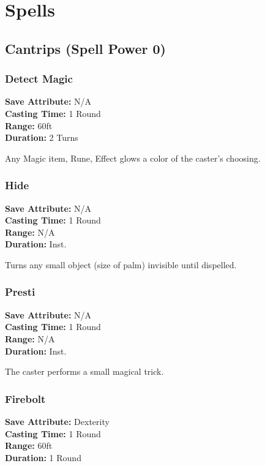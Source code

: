 \section*{Spells}%
\subsection*{Cantrips (Spell Power 0)}
\subsubsection*{Detect Magic}
\begin{mercClassInfo}
\textbf{Save Attribute:} N/A\\
\textbf{Casting Time:} 1 Round\\
\textbf{Range:} 60ft\\
\textbf{Duration:} 2 Turns
\end{mercClassInfo}

Any Magic item, Rune, Effect glows a color of the caster's choosing.

\subsubsection*{Hide}
\begin{mercClassInfo}
\textbf{Save Attribute:} N/A\\
\textbf{Casting Time:} 1 Round\\
\textbf{Range:} N/A\\
\textbf{Duration:} Inst.
\end{mercClassInfo}
Turns any small object (size of palm) invisible until dispelled.

\subsubsection*{Presti}
\begin{mercClassInfo}
\textbf{Save Attribute:} N/A\\
\textbf{Casting Time:} 1 Round\\
\textbf{Range:} N/A\\
\textbf{Duration:} Inst.
\end{mercClassInfo}
The caster performs a small magical trick.

\subsubsection*{Firebolt}
\begin{mercClassInfo}
\textbf{Save Attribute:} Dexterity\\
\textbf{Casting Time:} 1 Round\\
\textbf{Range:} 60ft\\
\textbf{Duration:} 1 Round
\end{mercClassInfo}

